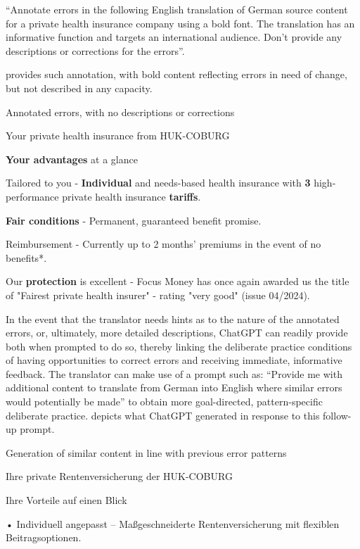 \documentclass[output=paper]{langscibook}
\begin{document}
\ea\label{ex:2:annotateerors}
“Annotate errors in the following English translation of German source content for a private health insurance company using a bold font. The translation has an informative function and targets an international audience. Don’t provide any descriptions or corrections for the errors”.
\z

 provides such annotation, with bold content reflecting errors in need of change, but not described in any capacity.

\ea\label{tab:2:5}
Annotated errors, with no descriptions or corrections\\

\ttfamily\raggedright
Your private health insurance from HUK-COBURG

\textbf{Your advantages} at a glance

Tailored to you - \textbf{Individual} and needs-based health insurance with \textbf{3} high-performance private health insurance \textbf{tariffs}.

\textbf{Fair conditions} - Permanent, guaranteed benefit promise.

Reimbursement - Currently up to 2 months' premiums in the event of no benefits*.

Our \textbf{protection} is excellent - Focus Money has once again awarded us the title of "Fairest private health insurer" - rating "very good" (issue 04/2024).
\z

In the event that the translator needs hints as to the nature of the annotated errors, or, ultimately, more detailed descriptions, ChatGPT can readily provide both when prompted to do so, thereby linking the deliberate practice conditions of having opportunities to correct errors and receiving immediate, informative feedback. The translator can make use of a prompt such as: “Provide me with additional content to translate from German into English where similar errors would potentially be made” to obtain more goal-directed, pattern-specific deliberate practice.  depicts what ChatGPT generated in response to this follow-up prompt.

\ea
\label{extab:2:6}
 Generation of similar content in line with previous error patterns
\ttfamily\raggedright

Ihre private Rentenversicherung der HUK-COBURG

Ihre Vorteile auf einen Blick

• Individuell angepasst – Maßgeschneiderte Rentenversicherung mit flexiblen Beitragsoptionen.
\end{document}

